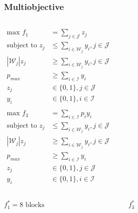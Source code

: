 \documentclass[10pt, compress]{beamer}
\begin{document}
\begin{frame}[fragile]
\frametitle{Multiobjective}
\begin{columns}[onlytextwidth]
\begin{align*}
\textrm{max } f_1 &= \sum_{j \in \mathcal{J}} z_j \\
\textrm{subject to } z_j &\leq \sum_{i \in \mathcal{W}_j} y_i, j \in \mathcal{J}\\
\left|\mathcal{W}_j\right|z_j &\geq \sum_{i \in \mathcal{W}_j} y_i, j \in \mathcal{J} \\
p_{max} &\geq \sum_{i \in \mathcal{I}} y_i  \\
z_j &\in \{0,1\}, j \in \mathcal{J} \\
y_i &\in \{0,1\}, i \in \mathcal{I} \\
\end{align*}
\begin{align*}
\textrm{max } f_3 &= \sum_{i \in \mathcal{I}} p_iy_i \\
\textrm{subject to } z_j &\leq \sum_{i \in \mathcal{W}_j} y_i, j \in \mathcal{J}\\
\left|\mathcal{W}_j\right|z_j &\geq \sum_{i \in \mathcal{W}_j} y_i, j \in \mathcal{J} \\
p_{max} &\geq \sum_{i \in \mathcal{I}} y_i  \\
z_j &\in \{0,1\}, j \in \mathcal{J} \\
y_i &\in \{0,1\}, i \in \mathcal{I}
\end{align*}
\end{columns}
\begin{center}
\alert{$f_1^* = 8 \textrm{ blocks} \quad \quad \quad \quad \quad \quad \quad \quad \quad \quad \quad \quad f_3^* $}
\end{center}
\end{frame}
\end{document}

